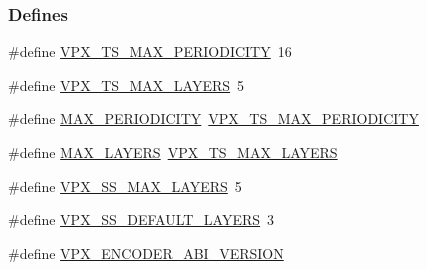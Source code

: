 \subsubsection*{\-Defines}
\begin{DoxyCompactItemize}
\item 
\#define \hyperlink{group__encoder_ga684b48cb6e47a258247637186557eb19}{\-V\-P\-X\-\_\-\-T\-S\-\_\-\-M\-A\-X\-\_\-\-P\-E\-R\-I\-O\-D\-I\-C\-I\-T\-Y}~16
\item 
\#define \hyperlink{group__encoder_ga2715ac3dd8bf2f5438c4bbfc82788eb2}{\-V\-P\-X\-\_\-\-T\-S\-\_\-\-M\-A\-X\-\_\-\-L\-A\-Y\-E\-R\-S}~5
\item 
\#define \hyperlink{group__encoder_gae6569d89cc61cb190aeeb00a1b40ad88}{\-M\-A\-X\-\_\-\-P\-E\-R\-I\-O\-D\-I\-C\-I\-T\-Y}~\hyperlink{group__encoder_ga684b48cb6e47a258247637186557eb19}{\-V\-P\-X\-\_\-\-T\-S\-\_\-\-M\-A\-X\-\_\-\-P\-E\-R\-I\-O\-D\-I\-C\-I\-T\-Y}
\item 
\#define \hyperlink{group__encoder_gade9d4b2ac5f29fe89ffea40e7c58c9d6}{\-M\-A\-X\-\_\-\-L\-A\-Y\-E\-R\-S}~\hyperlink{group__encoder_ga2715ac3dd8bf2f5438c4bbfc82788eb2}{\-V\-P\-X\-\_\-\-T\-S\-\_\-\-M\-A\-X\-\_\-\-L\-A\-Y\-E\-R\-S}
\item 
\#define \hyperlink{group__encoder_ga8ee6b12a5f4c97d9767adffb88fff7da}{\-V\-P\-X\-\_\-\-S\-S\-\_\-\-M\-A\-X\-\_\-\-L\-A\-Y\-E\-R\-S}~5
\item 
\#define \hyperlink{group__encoder_ga8324b8c1ebf8a80253d544584f9439eb}{\-V\-P\-X\-\_\-\-S\-S\-\_\-\-D\-E\-F\-A\-U\-L\-T\-\_\-\-L\-A\-Y\-E\-R\-S}~3
\item 
\hypertarget{group__encoder_gaa4f0b52293c08ba672429c3a03648b9d}{\#define \hyperlink{group__encoder_gaa4f0b52293c08ba672429c3a03648b9d}{\-V\-P\-X\-\_\-\-E\-N\-C\-O\-D\-E\-R\-\_\-\-A\-B\-I\-\_\-\-V\-E\-R\-S\-I\-O\-N}}\label{group__encoder_gaa4f0b52293c08ba672429c3a03648b9d}


\end{DoxyCompactItemize}
